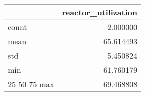 \begin{tabular}{lr}
\toprule
 & reactor\_utilization \\
\midrule
count & 2.000000 \\
mean & 65.614493 \\
std & 5.450824 \\
min & 61.760179 \\
25%
50%
75%
max & 69.468808 \\
\bottomrule
\end{tabular}


